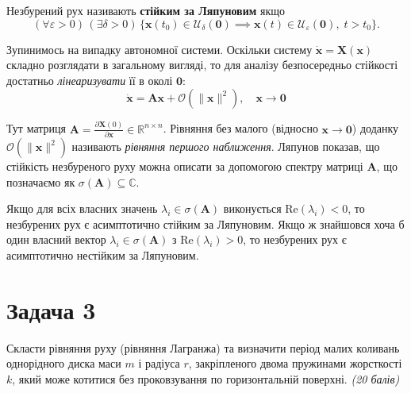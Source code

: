 \documentclass{hw_template}
\begin{document}
\begin{definition}
    Незбурений рух називають \textbf{стійким за Ляпуновим} якщо
    \begin{equation*}
        (\forall \varepsilon > 0) \, (\exists \delta > 0) \, \{\mathbf{x}(t_0) \in \mathcal{U}_{\delta}(\mathbf{0}) \implies \mathbf{x}(t) \in \mathcal{U}_{\varepsilon}(\mathbf{0}), \; t > t_0\}.
    \end{equation*}
\end{definition}

Зупинимось на випадку автономної системи. Оскільки систему $\dot{\mathbf{x}} =
\mathbf{X}(\mathbf{x})$ складно розглядати в загальному вигляді, то для 
аналізу безпосередньо стійкості достатньо \textit{лінеаризувати} її 
в околі $\mathbf{0}$:
\begin{equation*}
    \dot{\mathbf{x}} = \mathbf{A}\mathbf{x} + \mathcal{O}(\|\mathbf{x}\|^2), \quad \mathbf{x} \to \mathbf{0}
\end{equation*}

Тут матриця $\mathbf{A} = \frac{\partial \mathbf{X}(0)}{\partial \mathbf{x}} \in
\mathbb{R}^{n \times n}$. Рівняння без малого (відносно $\mathbf{x} \to
\mathbf{0}$) доданку $\mathcal{O}(\|\mathbf{x}\|^2)$ називають \textit{рівняння
першого наближення}. Ляпунов показав, що стійкість незбуреного руху можна
описати за допомогою спектру матриці $\mathbf{A}$, що позначаємо як
$\sigma(\mathbf{A}) \subseteq \mathbb{C}$.

\begin{theorem}
    Якщо для всіх власних значень $\lambda_i \in \sigma(\mathbf{A})$ виконується 
    $\text{Re}(\lambda_i) < 0$, то незбурених рух є асимптотично стійким за 
    Ляпуновим. Якщо ж знайшовся хоча б один власний вектор $\lambda_i \in
    \sigma(\mathbf{A})$ з $\text{Re}(\lambda_i) > 0$, то незбурених рух є
    асимптотично нестійким за Ляпуновим. 
\end{theorem}

\newpage

\section{Задача 3}

\begin{problem}
    Скласти рівняння руху (рівняння Лагранжа) та визначити період малих коливань
однорідного диска маси $m$ і радіуса $r$, закріпленого двома пружинами
жорсткості $k$, який може котитися без проковзування по горизонтальній поверхні.
\textit{(20 балів)}
\end{problem}
\end{document}
